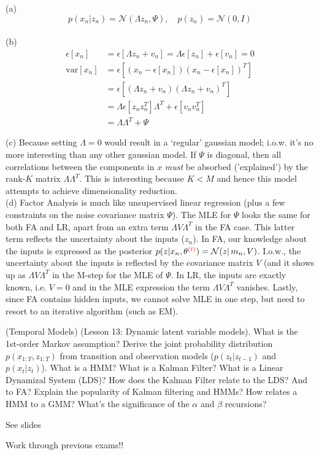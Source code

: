 \documentclass[a4paper]{article}
\newcommand{\N}{\mathcal{N}}
\newcommand{\mc}[1]{\mathcal{#1}}
\newcommand{\var}{\mathrm{var}}
\def\r#1{{\color{red}#1}}
\begin{document}
\begin{ExerciseList}
\Answer[ref={ex:6}]

(a) $$ p(x_n|z_n) = \mc{N}(\Lambda z_n,\Psi), \quad p(z_n)=\mc{N}(0,I)$$\\

(b) \begin{align*}
\epsilon[x_n] &= \epsilon[\Lambda z_n + v_n] = \Lambda \epsilon[z_n] + \epsilon[v_n] = 0\\
\var[x_n] &= \epsilon[(x_n-\epsilon[x_n])(x_n-\epsilon[x_n])^T]\\
    &=\epsilon[(\Lambda z_n + v_n)(\Lambda z_n + v_n)^T]\\
    &= \Lambda \epsilon[z_nz_n^T]\Lambda^T + \epsilon[v_nv_n^T]\\
    &=\Lambda\Lambda^T + \Psi
\end{align*}

(c) Because setting $\Lambda=0$ would result in a `regular' gaussian model; i.o.w. it's no more interesting than any other gaussian model. If $\Psi$ is diagonal, then all correlations between the components in $x$ \emph{must} be absorbed ('explained') by the rank-$K$ matrix $\Lambda \Lambda^T$. This is interesting because $K<M$ and hence this model attempts to achieve dimensionality reduction.\\

(d) Factor Analysis is much like unsupervised linear regression (plus a few constraints on the noise covariance matrix $\Psi$). The MLE for $\Psi$ looks the same for both FA and LR, apart from an extra term $\Lambda V \Lambda^T$ in the FA case. This latter term reflects the uncertainty about the inputs ($z_n$). In FA, our knowledge about the inputs is expressed as the posterior $p(z|x_n,\theta^{\r{(t)}}) = \N(z|\,m_n,V)$. I.o.w., the uncertainty about the inputs is reflected by the covariance matrix $V$ (and it shows up as $\Lambda V \Lambda^T$ in the M-step for the MLE of $\Psi$. In LR, the inputs are exactly known, i.e. $V=0$ and in the MLE expression the term $\Lambda V \Lambda^T$ vanishes. Lastly, since FA contains hidden inputs, we cannot solve MLE in one step, but need to resort to an iterative algorithm (such as EM).

\Exercise[label={ex:7}] (Temporal Models) (Lesson 13: Dynamic latent variable models).
What is the 1st-order Markov assumption? Derive the joint probability distribution $p(x_{1:T},z_{1:T})$ from transition and observation models ($p(z_t|z_{t-1})$ and $p(x_t|z_t)$). What is a HMM? What is a Kalman Filter? What is a Linear Dynamizal System (LDS)? How does the Kalman Filter relate to the LDS? And to FA? Explain the popularity of Kalman filtering and HMMs? How relates a HMM to a GMM? What's the significance of the $\alpha$ and $\beta$ recursions?

\Answer[ref={ex:7}]
See slides

\Exercise[label={final}] 
Work through previous exams!!


\end{ExerciseList}
\end{document}
